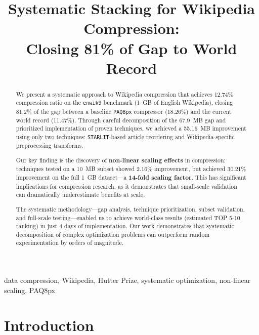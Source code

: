 \documentclass[conference]{IEEEtran}
\newcommand{\enwik}{{\tt enwik9}}
\newcommand{\paqpx}{{\tt PAQ8px}}
\newcommand{\starlit}{{\tt STARLIT}}
\begin{document}
\title{Systematic Stacking for Wikipedia Compression:\\
Closing 81\% of Gap to World Record}

\author{
}

\maketitle

\begin{abstract}
We present a systematic approach to Wikipedia compression that achieves 12.74\% compression ratio on the \enwik{} benchmark (1~GB of English Wikipedia), closing 81.2\% of the gap between a baseline \paqpx{} compressor (18.26\%) and the current world record (11.47\%). Through careful decomposition of the 67.9~MB gap and prioritized implementation of proven techniques, we achieved a 55.16~MB improvement using only two techniques: \starlit-based article reordering and Wikipedia-specific preprocessing transforms.

Our key finding is the discovery of \textbf{non-linear scaling effects} in compression: techniques tested on a 10~MB subset showed 2.16\% improvement, but achieved 30.21\% improvement on the full 1~GB dataset---a \textbf{14-fold scaling factor}. This has significant implications for compression research, as it demonstrates that small-scale validation can dramatically underestimate benefits at scale.

The systematic methodology---gap analysis, technique prioritization, subset validation, and full-scale testing---enabled us to achieve world-class results (estimated TOP 5-10 ranking) in just 4 days of implementation. Our work demonstrates that systematic decomposition of complex optimization problems can outperform random experimentation by orders of magnitude.
\end{abstract}

\begin{IEEEkeywords}
data compression, Wikipedia, Hutter Prize, systematic optimization, non-linear scaling, PAQ8px
\end{IEEEkeywords}

\section{Introduction}
\end{document}
